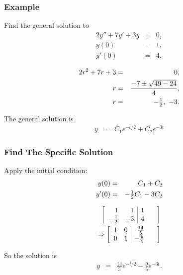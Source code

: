 \begin{frame}
  \frametitle{Example}

  Find the general solution to
  \begin{eqnarray*}
    2y'' + 7y' + 3y & = & 0, \\
    y(0) & = & 1, \\
    y'(0) & = & 4.
  \end{eqnarray*}

  {
    \begin{eqnarray*}
      2r^2 + 7r + 3 & = & 0, \\
      r & = & \frac{-7\pm\sqrt{49-24}}{4}, \\
      r & = & -\mbox{$\frac{1}{2}$},~-3.
    \end{eqnarray*}

    The general solution is
    \begin{eqnarray*}
      y & = & C_1 e^{-t/2} + C_2 e^{-3t}
    \end{eqnarray*}

  }
  

\end{frame}


\begin{frame}
  \frametitle{Find The Specific Solution}

  Apply the initial condition:
  \begin{eqnarray*}
    y(0) & = & C_1 + C_2 \\
    y'(0) & = & -\mbox{$\frac{1}{2}$} C_1 - 3 C_2
  \end{eqnarray*}

  \begin{eqnarray*}
    \left[ \begin{array}{rr|rr}
    1 & 1 & 1 & ~ \\ 
    -\mbox{$\frac{1}{2}$} & -3 & 4 & ~ \\ 
    \end{array} \right] \\
    \Rightarrow
    \left[ \begin{array}{rr|rr}
    1 & 0 & \frac{14}{5} & ~ \\ 
    0 & 1 & -\frac{9}{5} & ~ \\ 
    \end{array} \right]
  \end{eqnarray*}

  So the solution is
  \begin{eqnarray*}
    y & = & \frac{14}{5} e^{-t/2} - \frac{9}{5} e^{-3t}.
  \end{eqnarray*}
  

\end{frame}



